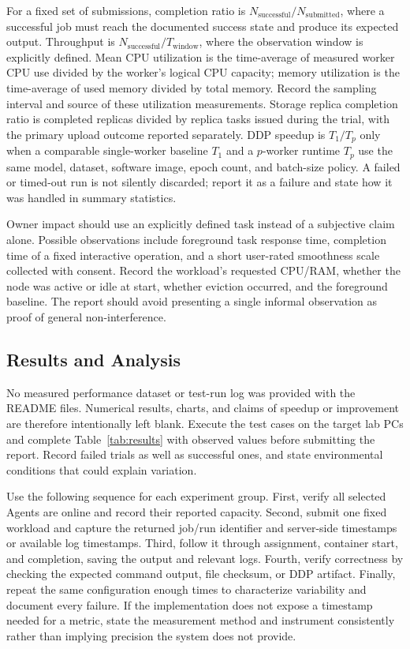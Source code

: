 \documentclass{article}
\begin{document}
For a fixed set of submissions, completion ratio is \(N_{\mathrm{successful}}/N_{\mathrm{submitted}}\), where a successful job must reach the documented success state and produce its expected output. Throughput is \(N_{\mathrm{successful}}/T_{\mathrm{window}}\), where the observation window is explicitly defined. Mean CPU utilization is the time-average of measured worker CPU use divided by the worker's logical CPU capacity; memory utilization is the time-average of used memory divided by total memory. Record the sampling interval and source of these utilization measurements. Storage replica completion ratio is completed replicas divided by replica tasks issued during the trial, with the primary upload outcome reported separately. DDP speedup is \(T_1/T_p\) only when a comparable single-worker baseline \(T_1\) and a \(p\)-worker runtime \(T_p\) use the same model, dataset, software image, epoch count, and batch-size policy. A failed or timed-out run is not silently discarded; report it as a failure and state how it was handled in summary statistics.

Owner impact should use an explicitly defined task instead of a subjective claim alone. Possible observations include foreground task response time, completion time of a fixed interactive operation, and a short user-rated smoothness scale collected with consent. Record the workload's requested CPU/RAM, whether the node was active or idle at start, whether eviction occurred, and the foreground baseline. The report should avoid presenting a single informal observation as proof of general non-interference.

	\subsection{Results and Analysis}
No measured performance dataset or test-run log was provided with the README files. Numerical results, charts, and claims of speedup or improvement are therefore intentionally left blank. Execute the test cases on the target lab PCs and complete Table~\ref{tab:results} with observed values before submitting the report. Record failed trials as well as successful ones, and state environmental conditions that could explain variation.

Use the following sequence for each experiment group. First, verify all selected Agents are online and record their reported capacity. Second, submit one fixed workload and capture the returned job/run identifier and server-side timestamps or available log timestamps. Third, follow it through assignment, container start, and completion, saving the output and relevant logs. Fourth, verify correctness by checking the expected command output, file checksum, or DDP artifact. Finally, repeat the same configuration enough times to characterize variability and document every failure. If the implementation does not expose a timestamp needed for a metric, state the measurement method and instrument consistently rather than implying precision the system does not provide.
\end{document}

